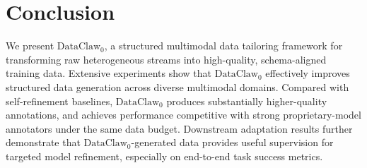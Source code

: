 \section{Conclusion}

We present $\text{DataClaw}_0$, a structured multimodal data tailoring framework for transforming raw heterogeneous streams into high-quality, schema-aligned training data. 
Extensive experiments show that $\text{DataClaw}_0$ effectively improves structured data generation across diverse multimodal domains. Compared with self-refinement baselines, $\text{DataClaw}_0$ produces substantially higher-quality annotations, and achieves performance competitive with strong proprietary-model annotators under the same data budget. Downstream adaptation results further demonstrate that $\text{DataClaw}_0$-generated data provides useful supervision for targeted model refinement, especially on end-to-end task success metrics.